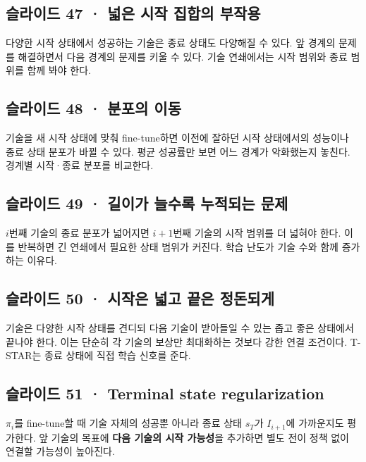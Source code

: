 \documentclass[11pt,a4paper]{article}
\begin{document}
\subsection{슬라이드 47 · 넓은 시작 집합의 부작용}

다양한 시작 상태에서 성공하는 기술은 종료 상태도 다양해질 수 있다. 앞 경계의 문제를 해결하면서 다음 경계의 문제를 키울 수 있다. 기술 연쇄에서는 시작 범위와 종료 범위를 함께 봐야 한다.\par

\subsection{슬라이드 48 · 분포의 이동}

기술을 새 시작 상태에 맞춰 fine-tune하면 이전에 잘하던 시작 상태에서의 성능이나 종료 상태 분포가 바뀔 수 있다. 평균 성공률만 보면 어느 경계가 악화했는지 놓친다. 경계별 시작·종료 분포를 비교한다.\par

\subsection{슬라이드 49 · 길이가 늘수록 누적되는 문제}

$i$번째 기술의 종료 분포가 넓어지면 $i+1$번째 기술의 시작 범위를 더 넓혀야 한다. 이를 반복하면 긴 연쇄에서 필요한 상태 범위가 커진다. 학습 난도가 기술 수와 함께 증가하는 이유다.\par

\subsection{슬라이드 50 · 시작은 넓고 끝은 정돈되게}

기술은 다양한 시작 상태를 견디되 다음 기술이 받아들일 수 있는 좁고 좋은 상태에서 끝나야 한다. 이는 단순히 각 기술의 보상만 최대화하는 것보다 강한 연결 조건이다. T-STAR는 종료 상태에 직접 학습 신호를 준다.\par

\subsection{슬라이드 51 · Terminal state regularization}

$\pi_i$를 fine-tune할 때 기술 자체의 성공뿐 아니라 종료 상태 $s_T$가 $I_{i+1}$에 가까운지도 평가한다. 앞 기술의 목표에 \textbf{다음 기술의 시작 가능성}을 추가하면 별도 전이 정책 없이 연결할 가능성이 높아진다.\par
\end{document}

